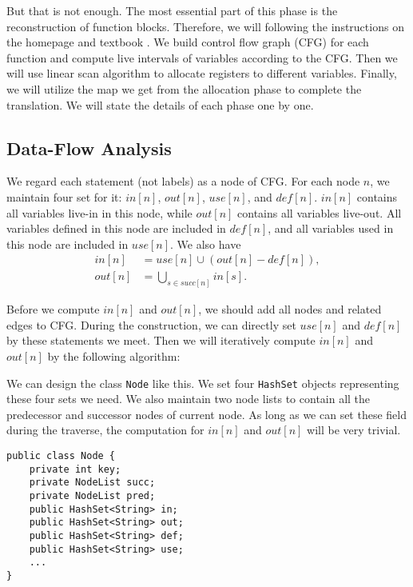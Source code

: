 \documentclass[letterpaper, 14pt]{article}
\begin{document}
But that is not enough. The most essential part of this phase is the reconstruction of function blocks. Therefore, we will following the instructions on the homepage \cite{homepage} and textbook \cite{book}. We build control flow graph (CFG) for each function and compute live intervals of variables according to the CFG. Then we will use linear scan algorithm \cite{paper} to allocate registers to different variables. Finally, we will utilize the map we get from the allocation phase to complete the translation. We will state the details of each phase one by one. 

\subsection{Data-Flow Analysis}

We regard each statement (not labels) as a node of CFG. For each node $n$, we maintain four set for it: $in[n]$, $out[n]$, $use[n]$, and $def[n]$. $in[n]$ contains all variables live-in in this node, while $out[n]$ contains all variables live-out. All variables defined in this node are included in $def[n]$, and all variables used in this node are included in $use[n]$. We also have
\begin{align*}
in[n] &= use[n]\cup(out[n]-def[n]), \\
out[n] &= \bigcup_{s\in succ[n]}{in[s]}. 
\end{align*}

Before we compute $in[n]$ and $out[n]$, we should add all nodes and related edges to CFG. During the construction, we can directly set $use[n]$ and $def[n]$ by these statements we meet. Then we will iteratively compute $in[n]$ and $out[n]$ by the following algorithm:
\begin{algorithm}
\begin{algorithmic}[1]
\Repeat
	\EndFor
{}
\end{algorithmic}
\end{algorithm}

We can design the class \texttt{Node} like this. We set four \texttt{HashSet} objects representing these four sets we need. We also maintain two node lists to contain all the predecessor and successor nodes of current node. As long as we can set these field during the traverse, the computation for $in[n]$ and $out[n]$ will be very trivial. 
\begin{lstlisting}
public class Node {
	private int key;
	private NodeList succ;
	private NodeList pred;
	public HashSet<String> in;
	public HashSet<String> out;
	public HashSet<String> def;
	public HashSet<String> use;
	...
}
\end{lstlisting}
\end{document}
